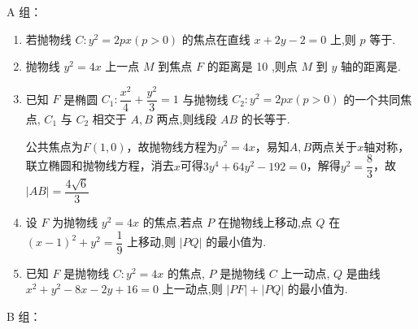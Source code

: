 A 组：
\begin{enumerate}
    \item 若抛物线 $C : {y}^{2} = {2px}\left( {p > 0}\right)$ 的焦点在直线 $x + {2y} - 2 = 0$ 上,则 $p$ 等于.
    
    \item 抛物线 ${y}^{2} = {4x}$ 上一点 $M$ 到焦点 $F$ 的距离是 10 ,则点 $M$ 到 $y$ 轴的距离是.

    \item 已知 $F$ 是椭圆 ${C}_{1} : \dfrac{{x}^{2}}{4} + \dfrac{{y}^{2}}{3} = 1$ 与抛物线 ${C}_{2} : {y}^{2} = {2px}\left( {p > 0}\right)$ 的一个共同焦点, ${C}_{1}$ 与 ${C}_{2}$ 相交于 $A,B$ 两点,则线段 ${AB}$ 的长等于.
    \begin{jieda}
        公共焦点为$F(1, 0)$，故抛物线方程为$y^2 = 4x$，易知$A, B$两点关于$x$轴对称，联立椭圆和抛物线方程，消去$x$可得$3y^4+64y^2-192 = 0$，解得$y^2 = \dfrac{8}{3}$，故$|AB| = \dfrac{4\sqrt{6}}{3}$
    \end{jieda}

    \item 设 $F$ 为抛物线 ${y}^{2} = {4x}$ 的焦点,若点 $P$ 在抛物线上移动,点 $Q$ 在 ${\left( x - 1\right) }^{2} + {y}^{2} = \dfrac{1}{9}$ 上移动,则 $\left| {PQ}\right|$ 的最小值为.

    \item 已知 $F$ 是抛物线 $C : {y}^{2} = {4x}$ 的焦点, $P$ 是抛物线 $C$ 上一动点, $Q$ 是曲线 ${x}^{2} + {y}^{2} - {8x} - {2y} + {16} = 0$ 上一动点,则 $\left| {PF}\right|  + \left| {PQ}\right|$ 的最小值为.

\end{enumerate}
B 组：
